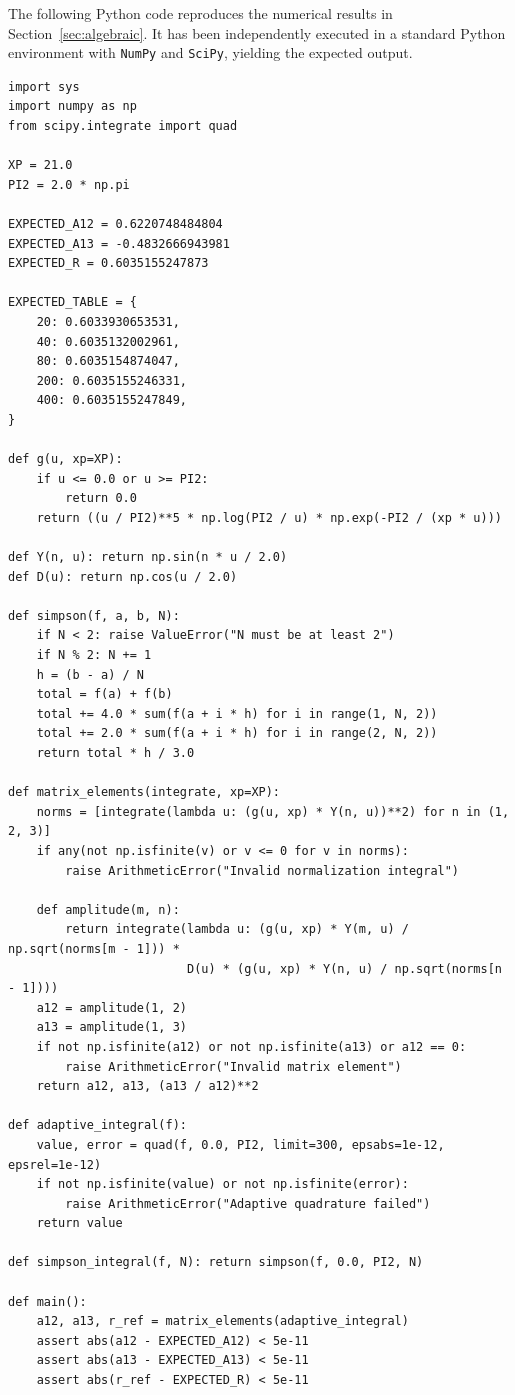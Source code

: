 \documentclass[11pt,a4paper]{article}
\begin{document}
The following Python code reproduces the numerical results in Section~\ref{sec:algebraic}. It has been independently executed in a standard Python environment with \texttt{NumPy} and \texttt{SciPy}, yielding the expected output.

\begin{verbatim}
import sys
import numpy as np
from scipy.integrate import quad

XP = 21.0
PI2 = 2.0 * np.pi

EXPECTED_A12 = 0.6220748484804
EXPECTED_A13 = -0.4832666943981
EXPECTED_R = 0.6035155247873

EXPECTED_TABLE = {
    20: 0.6033930653531,
    40: 0.6035132002961,
    80: 0.6035154874047,
    200: 0.6035155246331,
    400: 0.6035155247849,
}

def g(u, xp=XP):
    if u <= 0.0 or u >= PI2:
        return 0.0
    return ((u / PI2)**5 * np.log(PI2 / u) * np.exp(-PI2 / (xp * u)))

def Y(n, u): return np.sin(n * u / 2.0)
def D(u): return np.cos(u / 2.0)

def simpson(f, a, b, N):
    if N < 2: raise ValueError("N must be at least 2")
    if N % 2: N += 1
    h = (b - a) / N
    total = f(a) + f(b)
    total += 4.0 * sum(f(a + i * h) for i in range(1, N, 2))
    total += 2.0 * sum(f(a + i * h) for i in range(2, N, 2))
    return total * h / 3.0

def matrix_elements(integrate, xp=XP):
    norms = [integrate(lambda u: (g(u, xp) * Y(n, u))**2) for n in (1, 2, 3)]
    if any(not np.isfinite(v) or v <= 0 for v in norms):
        raise ArithmeticError("Invalid normalization integral")

    def amplitude(m, n):
        return integrate(lambda u: (g(u, xp) * Y(m, u) / np.sqrt(norms[m - 1])) * 
                         D(u) * (g(u, xp) * Y(n, u) / np.sqrt(norms[n - 1])))
    a12 = amplitude(1, 2)
    a13 = amplitude(1, 3)
    if not np.isfinite(a12) or not np.isfinite(a13) or a12 == 0:
        raise ArithmeticError("Invalid matrix element")
    return a12, a13, (a13 / a12)**2

def adaptive_integral(f):
    value, error = quad(f, 0.0, PI2, limit=300, epsabs=1e-12, epsrel=1e-12)
    if not np.isfinite(value) or not np.isfinite(error):
        raise ArithmeticError("Adaptive quadrature failed")
    return value

def simpson_integral(f, N): return simpson(f, 0.0, PI2, N)

def main():
    a12, a13, r_ref = matrix_elements(adaptive_integral)
    assert abs(a12 - EXPECTED_A12) < 5e-11
    assert abs(a13 - EXPECTED_A13) < 5e-11
    assert abs(r_ref - EXPECTED_R) < 5e-11


\end{verbatim}
\end{document}
